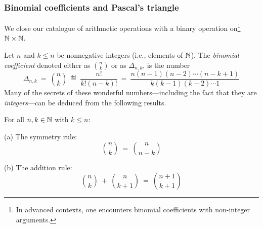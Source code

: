 \subsubsection{Binomial coefficients and Pascal's triangle}
\label{sec:binomial-coeff}

We close our catalogue of arithmetic operations with a binary
operation on\footnote{In advanced contexts, one encounters binomial
  coefficients with non-integer arguments.}~$\mathbb{N} \times \mathbb{N}$.

\smallskip

Let $n$ and $k \leq n$ be nonnegative integers (i.e., elements of
$\mathbb{N}$).  The {\it binomial coefficient} denoted either as
$\displaystyle {n \choose k}$ or as $\Delta_{n,k}$, is the number
\begin{equation}
\label{eq:binom-coeff}
\Delta_{n,k} \ = \
{n \choose k} \ \eqdef \ \frac{n!}{k!(n-k)!} \ = \
\frac{n(n-1)(n-2) \cdots (n-k+1)}{k (k-1)(k-2) \cdots 1}
\end{equation}
Many of the secrets of these wonderful numbers---including the fact
that they are {\em integers}---can be deduced from the following
results.

\begin{prop}
\label{thm:manipulate-binom-coeff}
For all $n, k \in \mathbb{N}$ with $k \leq n$:

{\rm (a)} The symmetry rule:
\begin{equation}
\label{eq:symmetry-binom-coeff}
{n \choose k} \ = \ {n \choose {n-k}}
\end{equation}

{\rm (b)} The addition rule:
\begin{equation}
\label{eq:add-binom-coeff}
{n \choose k} \ + \ {n \choose {k+1}} \ = \ {{n+1} \choose {k+1}}
\end{equation}
\end{prop}

